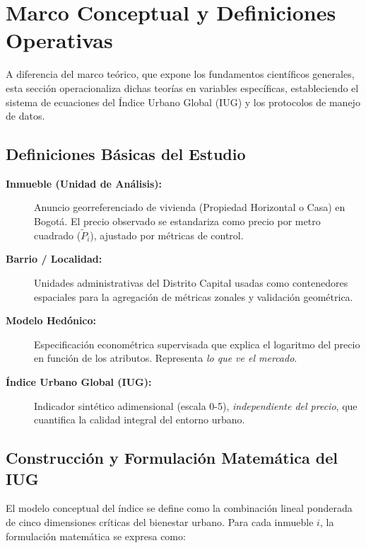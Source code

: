 \documentclass[12pt, a4paper, twoside, openright]{report}
\theoremstyle{plain}
\theoremstyle{definition}
\begin{document}

\section{Marco Conceptual y Definiciones Operativas}
\label{sec:marco_conceptual}

A diferencia del marco teórico, que expone los fundamentos científicos generales, esta sección operacionaliza dichas teorías en variables específicas, estableciendo el sistema de ecuaciones del Índice Urbano Global (IUG) y los protocolos de manejo de datos.

\subsection{Definiciones Básicas del Estudio}
\begin{description}
    \item[\textbf{Inmueble (Unidad de Análisis):}] Anuncio georreferenciado de vivienda (Propiedad Horizontal o Casa) en Bogotá. El precio observado se estandariza como precio por metro cuadrado ($\tilde P_i$), ajustado por métricas de control.
    \item[\textbf{Barrio / Localidad:}] Unidades administrativas del Distrito Capital usadas como contenedores espaciales para la agregación de métricas zonales y validación geométrica.
    \item[\textbf{Modelo Hedónico:}] Especificación econométrica supervisada que explica el logaritmo del precio en función de los atributos. Representa \emph{lo que ve el mercado}.
    \item[\textbf{Índice Urbano Global (IUG):}] Indicador sintético adimensional (escala 0-5), \emph{independiente del precio}, que cuantifica la calidad integral del entorno urbano.
\end{description}

\subsection{Construcción y Formulación Matemática del IUG}
\label{subsec:construccion_iug}

El modelo conceptual del índice se define como la combinación lineal ponderada de cinco dimensiones críticas del bienestar urbano. Para cada inmueble $i$, la formulación matemática se expresa como:
\end{document}
